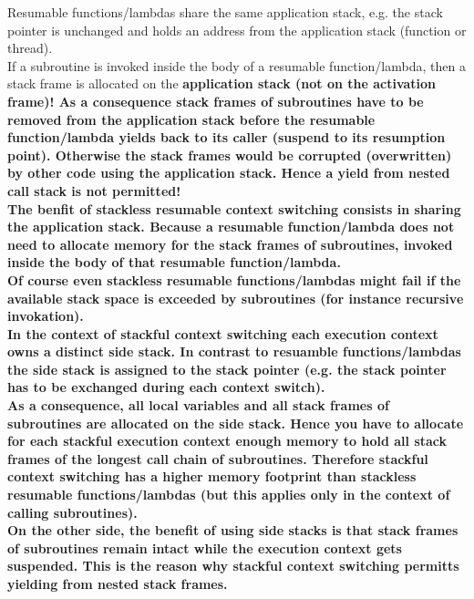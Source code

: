 Resumable functions/lambdas share the same application stack, e.g. the stack
pointer is unchanged and holds an address from the application stack (function
\main or thread).\\
If a subroutine is invoked inside the body of a resumable function/lambda, then
a stack frame is allocated on the \bf{application stack} (not on the activation
frame)! As a consequence stack frames of subroutines have to be removed from the
application stack before the resumable function/lambda yields back to its caller
(suspend to its resumption point). Otherwise the stack frames would be corrupted
(overwritten) by other code using the application stack. Hence a yield from
nested call stack is not permitted!\\
The benfit of stackless resumable context switching consists in sharing the
application stack. Because a resumable function/lambda does not need to allocate
memory for the stack frames of subroutines, invoked inside the body of that
resumable function/lambda.\\
\newline
Of course even stackless resumable functions/lambdas might fail if the available
stack space is exceeded by subroutines (for instance recursive invokation).\\
\newline
In the context of stackful context switching each execution context owns a
distinct side stack. In contrast to resuamble functions/lambdas the side stack
is assigned to the stack pointer (e.g. the stack pointer has to be exchanged
during each context switch).\\
As a consequence, all local variables and all stack frames of subroutines are
allocated on the side stack. Hence you have to allocate for each stackful
execution context enough memory to hold all stack frames of the longest call
chain of subroutines. Therefore stackful context switching has a higher memory
footprint than stackless resumable functions/lambdas (but this applies only in
the context of calling subroutines).\\
On the other side, the benefit of using side stacks is that stack frames of
subroutines remain intact while the execution context gets suspended. This is
the reason why stackful context switching permitts yielding from nested stack
frames.\\
\newline
